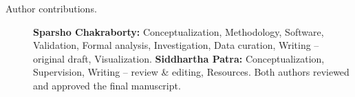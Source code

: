 \documentclass[pdflatex,sn-basic]{sn-jnl}
\begin{document}
\begin{description}
  \item[Author contributions.] \textbf{Sparsho Chakraborty:}
        Conceptualization, Methodology, Software, Validation, Formal analysis,
        Investigation, Data curation, Writing -- original draft, Visualization.
        \textbf{Siddhartha Patra:} Conceptualization, Supervision, Writing --
        review \& editing, Resources. Both authors reviewed and approved the
        final manuscript.
\end{description}

% 

\end{document}
